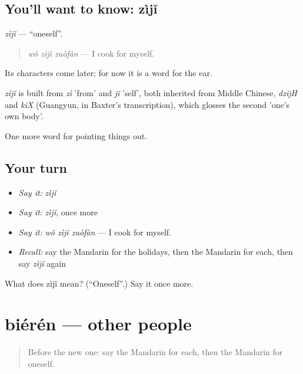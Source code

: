 \subsection*{You'll want to know: zìjǐ}
\emph{zìjǐ} — \textquotedblleft{}oneself\textquotedblright{}.

\begin{quote}
\emph{wǒ zìjǐ zuòfàn} — I cook for myself.
\end{quote}

Its characters come later; for now it is a word for the ear.

\begin{cousinweb}
\emph{zìjǐ} is built from \emph{zì} 'from' and \emph{jǐ} 'self', both inherited from Middle Chinese, \emph{dzijH} and \emph{kiX} (Guangyun, in Baxter's transcription), which glosses the second 'one's own body'.
\end{cousinweb}

\begin{grammarlens}[title={What you've built}]
One more word for pointing things out.
\end{grammarlens}

\subsection*{Your turn}
\begin{itemize}
\raggedright
  \item \emph{Say it:} \emph{zìjǐ}
  \item \emph{Say it:} \emph{zìjǐ}, once more
  \item \emph{Say it:} \emph{wǒ zìjǐ zuòfàn} — I cook for myself.
  \item \emph{Recall:} say the Mandarin for the holidays, then the Mandarin for each, then say \emph{zìjǐ} again
\end{itemize}

\begin{tcolorbox}[breakable,colback=teal!4,colframe=teal!35!black,title={Before you move on}]
What does zìjǐ mean? (\textquotedblleft{}Oneself\textquotedblright{}.) Say it once more.
\end{tcolorbox}
\section[biérén]{biérén — other people}

\label{lesson:ZH-C138-bieren}



\begin{quote}
Before the new one: say the Mandarin for each, then the Mandarin for oneself.
\end{quote}

